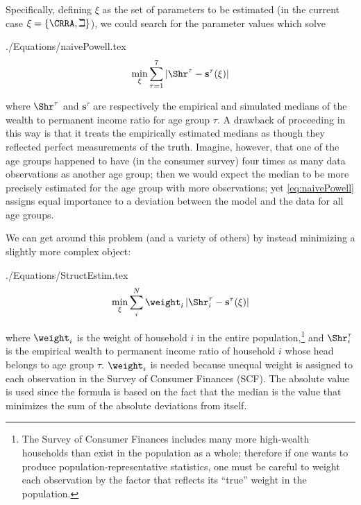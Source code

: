 \documentclass[\econtexRoot/SolvingMicroDSOPs]{subfiles}
\begin{document}
Specifically, defining $\xi$ as the set of parameters
to be estimated (in the current case $\xi =\{\CRRA ,\beth\}$), we could search for
the parameter values which solve
\begin{verbatimwrite}{./Equations/naivePowell.tex}
  \begin{equation}
    \begin{gathered}
      \begin{aligned}
        \min_{\xi} \sum_{\tau=1}^{7} |\Shr^{\tau} -\mathbf{s}^{\tau}(\xi)|  \label{eq:naivePowell}
      \end{aligned}
    \end{gathered}
  \end{equation}
\end{verbatimwrite}
\unskip
where $\Shr^{\tau }$ and $\mathbf{s}^{\tau}$ are respectively the empirical
and simulated medians of the wealth to permanent income ratio for age group $\tau$.
A drawback of proceeding in this way is that it treats the empirically
estimated medians as though they reflected perfect measurements of the
truth. Imagine, however, that one of the age groups happened to have
(in the consumer survey) four times as many data observations as
another age group; then we would expect the median to be more
precisely estimated for the age group with more observations; yet
\eqref{eq:naivePowell} assigns equal importance to a deviation between
the model and the data for all age groups.

We can get around this problem (and a variety of others) by instead minimizing a slightly more complex object:
\begin{verbatimwrite}{./Equations/StructEstim.tex}
  \begin{equation}
    \min_{\xi}\sum_{i}^{N}\weight _{i}\left|\Shr_{i}^{\tau }-\mathbf{s}^{\tau}(\xi )\right|\label{eq:StructEstim}
  \end{equation}
\end{verbatimwrite}
\unskip
where $\weight_{i}$ is the weight of household $i$ in the entire
population,\footnote{The Survey of Consumer Finances includes many
  more high-wealth households than exist in the population as a whole;
  therefore if one wants to produce population-representative
  statistics, one must be careful to weight each observation by the
  factor that reflects its ``true'' weight in the population.} and
$\Shr_{i}^{\tau }$ is the empirical wealth to permanent income
ratio of household $i$ whose head belongs to age group
$\tau$. $\weight _{i}$ is needed because unequal weight is assigned to
each observation in the Survey of Consumer Finances (SCF). The
absolute value is used since the formula is based on the fact that the
median is the value that minimizes the sum of the absolute deviations
from itself.
\end{document}

